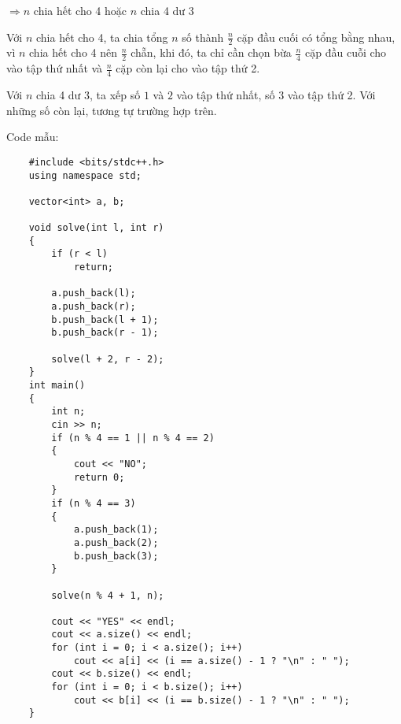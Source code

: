 \documentclass[10pt]{article}
\begin{document}
$\Rightarrow n$ chia hết cho 4 hoặc $n$ chia 4 dư 3

Với $n$ chia hết cho 4, ta chia tổng $n$ số thành $\frac{n}{2}$ cặp đầu cuối có tổng bằng nhau, vì $n$ chia hết cho 4 nên $\frac{n}{2}$ chẵn, khi đó, ta chỉ cần chọn bừa $\frac{n}{4}$ cặp đầu cuỗi cho vào tập thứ nhất và $\frac{n}{4}$ cặp còn lại cho vào tập thứ 2.

Với $n$ chia 4 dư 3, ta xếp số $1$ và $2$ vào tập thứ nhất, số $3$ vào tập thứ 2. Với những số còn lại, tương tự trường hợp trên.

Code mẫu:
\begin{lstlisting}
    #include <bits/stdc++.h>
    using namespace std;

    vector<int> a, b;

    void solve(int l, int r)
    {
        if (r < l)
            return;

        a.push_back(l);
        a.push_back(r);
        b.push_back(l + 1);
        b.push_back(r - 1);

        solve(l + 2, r - 2);
    }
    int main()
    {
        int n;
        cin >> n;
        if (n % 4 == 1 || n % 4 == 2)
        {
            cout << "NO";
            return 0;
        }
        if (n % 4 == 3)
        {
            a.push_back(1);
            a.push_back(2);
            b.push_back(3);
        }

        solve(n % 4 + 1, n);

        cout << "YES" << endl;
        cout << a.size() << endl;
        for (int i = 0; i < a.size(); i++)
            cout << a[i] << (i == a.size() - 1 ? "\n" : " ");
        cout << b.size() << endl;
        for (int i = 0; i < b.size(); i++)
            cout << b[i] << (i == b.size() - 1 ? "\n" : " ");
    }
\end{lstlisting}
\end{document}
